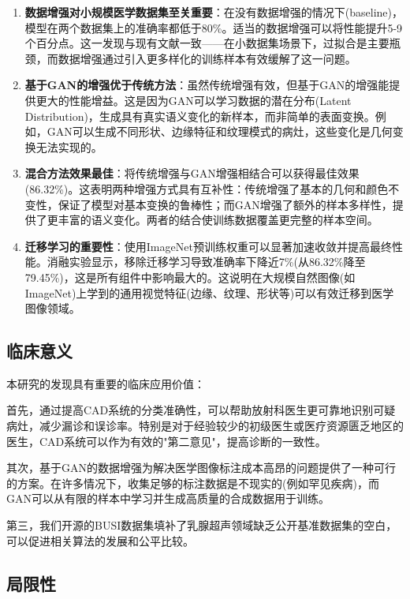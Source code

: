 \documentclass[supercite]{../Hust-undergraduate-translation/Experimental_Report}
\theoremstyle{definition}
\begin{document}
\begin{enumerate}
\item \textbf{数据增强对小规模医学数据集至关重要}：在没有数据增强的情况下(baseline)，模型在两个数据集上的准确率都低于80\%。适当的数据增强可以将性能提升5-9个百分点。这一发现与现有文献一致——在小数据集场景下，过拟合是主要瓶颈，而数据增强通过引入更多样化的训练样本有效缓解了这一问题。

\item \textbf{基于GAN的增强优于传统方法}：虽然传统增强有效，但基于GAN的增强能提供更大的性能增益。这是因为GAN可以学习数据的潜在分布(Latent Distribution)，生成具有真实语义变化的新样本，而非简单的表面变换。例如，GAN可以生成不同形状、边缘特征和纹理模式的病灶，这些变化是几何变换无法实现的。

\item \textbf{混合方法效果最佳}：将传统增强与GAN增强相结合可以获得最佳效果(86.32\%)。这表明两种增强方式具有互补性：传统增强了基本的几何和颜色不变性，保证了模型对基本变换的鲁棒性；而GAN增强了额外的样本多样性，提供了更丰富的语义变化。两者的结合使训练数据覆盖更完整的样本空间。

\item \textbf{迁移学习的重要性}：使用ImageNet预训练权重可以显著加速收敛并提高最终性能。消融实验显示，移除迁移学习导致准确率下降近7\%(从86.32\%降至79.45\%)，这是所有组件中影响最大的。这说明在大规模自然图像(如ImageNet)上学到的通用视觉特征(边缘、纹理、形状等)可以有效迁移到医学图像领域。
\end{enumerate}

\subsection{临床意义}

本研究的发现具有重要的临床应用价值：

首先，通过提高CAD系统的分类准确性，可以帮助放射科医生更可靠地识别可疑病灶，减少漏诊和误诊率。特别是对于经验较少的初级医生或医疗资源匮乏地区的医生，CAD系统可以作为有效的"第二意见"，提高诊断的一致性。

其次，基于GAN的数据增强为解决医学图像标注成本高昂的问题提供了一种可行的方案。在许多情况下，收集足够的标注数据是不现实的(例如罕见疾病)，而GAN可以从有限的样本中学习并生成高质量的合成数据用于训练。

第三，我们开源的BUSI数据集填补了乳腺超声领域缺乏公开基准数据集的空白，可以促进相关算法的发展和公平比较。

\subsection{局限性}
\end{document}
